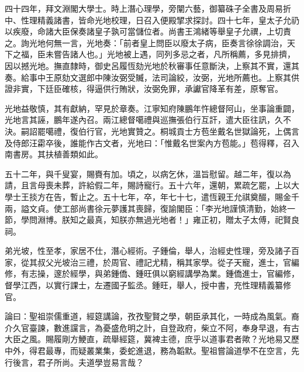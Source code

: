 \begin{pinyinscope}
四十四年，拜文淵閣大學士。時上潛心理學，旁闡六藝，御纂硃子全書及周易折中、性理精義諸書，皆命光地校理，日召入便殿揅求探討。四十七年，皇太子允礽以疾廢，命諸大臣保奏諸皇子孰可當儲位者。尚書王鴻緒等舉皇子允禩，上切責之。詢光地何無一言，光地奏：「前者皇上問臣以廢太子病，臣奏言徐徐調治，天下之福，臣未嘗告諸人也。」光地被上遇，同列多忌之者，凡所稱薦，多見排擠，因以撼光地。撫直隸時，御史呂履恆劾光地於秋審事任意斷決，上察其不實，還其奏。給事中王原劾文選郎中陳汝弼受贓，法司論絞，汝弼，光地所薦也。上察其供證非實，下廷臣確核，得逼供行賄狀，汝弼免罪，承讞官降革有差，原奪官。

光地益敬慎，其有獻納，罕見於章奏。江寧知府陳鵬年忤總督阿山，坐事論重闢，光地言其誣，鵬年遂內召。兩江總督噶禮與巡撫張伯行互訐，遣大臣往訊，久不決。嗣詔罷噶禮，復伯行官，光地實贊之。桐城貢士方苞坐戴名世獄論死，上偶言及侍郎汪霦卒後，誰能作古文者，光地曰：「惟戴名世案內方苞能。」苞得釋，召入南書房。其扶植善類如此。

五十二年，與千叟宴，賜賚有加。頃之，以病乞休，溫旨慰留。越二年，復以為請，且言母喪未葬，許給假二年，賜詩寵行。五十六年，還朝，累疏乞罷，上以大學士王掞方在告，暫止之。五十七年，卒，年七十七，遣恆親王允祺奠醊，賜金千兩，謚文貞。使工部尚書徐元夢護其喪歸，復諭閣臣：「李光地謹慎清勤，始終一節，學問淵博。朕知之最真，知朕亦無過光地者！」雍正初，贈太子太傅，祀賢良祠。

弟光坡，性至孝，家居不仕，潛心經術。子鍾倫，舉人，治經史性理，旁及諸子百家，從其叔父光坡治三禮，於周官、禮記尤精，稱其家學。從子天寵，進士，官編修，有志操，邃於經學，與弟鍾僑、鍾旺俱以窮經講學為業。鍾僑進士，官編修，督學江西，以實行課士，左遷國子監丞。鍾旺，舉人，授中書，充性理精義纂修官。

論曰：聖祖崇儒重道，經筵講論，孜孜聖賢之學，朝臣承其化，一時成為風氣。裔介久官臺諫，數進讜言，為憂盛危明之計，自登政府，柴立不阿，奉身早退，有古大臣之風。賜履剛方鯁直，疏舉經筵，冀裨主德，庶乎以道事君者歟？光地易又歷中外，得君最專，而疑叢業集，委蛇進退，務為韜默。聖祖嘗論道學不在空言，先行後言，君子所尚。夫道學豈易言哉？


\end{pinyinscope}